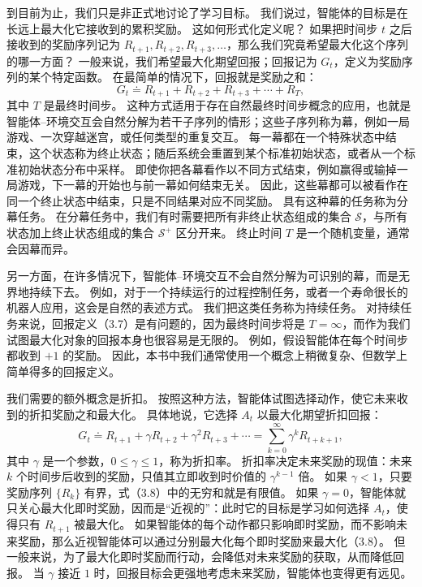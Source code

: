 \documentclass[UTF8,12pt,a4paper,fontset=fandol]{ctexart}
\begin{document}
到目前为止，我们只是非正式地讨论了学习目标。
我们说过，智能体的目标是在长远上最大化它接收到的累积奖励。
这如何形式化定义呢？
如果把时间步 $t$ 之后接收到的奖励序列记为 $R_{t+1},R_{t+2},R_{t+3},\ldots$，那么我们究竟希望最大化这个序列的哪一方面？
一般来说，我们希望最大化期望回报；回报记为 $G_t$，定义为奖励序列的某个特定函数。
在最简单的情况下，回报就是奖励之和：
\begin{equation}
G_t\doteq R_{t+1}+R_{t+2}+R_{t+3}+\cdots+R_T,
\tag{3.7}
\end{equation}
其中 $T$ 是最终时间步。
这种方式适用于存在自然最终时间步概念的应用，也就是智能体--环境交互会自然分解为若干子序列的情形；这些子序列称为幕，例如一局游戏、一次穿越迷宫，或任何类型的重复交互。
每一幕都在一个特殊状态中结束，这个状态称为终止状态；随后系统会重置到某个标准初始状态，或者从一个标准初始状态分布中采样。
即使你把各幕看作以不同方式结束，例如赢得或输掉一局游戏，下一幕的开始也与前一幕如何结束无关。
因此，这些幕都可以被看作在同一个终止状态中结束，只是不同结果对应不同奖励。
具有这种幕的任务称为分幕任务。
在分幕任务中，我们有时需要把所有非终止状态组成的集合 $\mathcal{S}$，与所有状态加上终止状态组成的集合 $\mathcal{S}^+$ 区分开来。
终止时间 $T$ 是一个随机变量，通常会因幕而异。

另一方面，在许多情况下，智能体--环境交互不会自然分解为可识别的幕，而是无界地持续下去。
例如，对于一个持续运行的过程控制任务，或者一个寿命很长的机器人应用，这会是自然的表述方式。
我们把这类任务称为持续任务。
对持续任务来说，回报定义（3.7）是有问题的，因为最终时间步将是 $T=\infty$，而作为我们试图最大化对象的回报本身也很容易是无限的。
例如，假设智能体在每个时间步都收到 $+1$ 的奖励。
因此，本书中我们通常使用一个概念上稍微复杂、但数学上简单得多的回报定义。

我们需要的额外概念是折扣。
按照这种方法，智能体试图选择动作，使它未来收到的折扣奖励之和最大化。
具体地说，它选择 $A_t$ 以最大化期望折扣回报：
\begin{equation}
G_t\doteq R_{t+1}+\gamma R_{t+2}+\gamma^2R_{t+3}+\cdots
=\sum_{k=0}^{\infty}\gamma^kR_{t+k+1},
\tag{3.8}
\end{equation}
其中 $\gamma$ 是一个参数，$0\leq\gamma\leq1$，称为折扣率。
折扣率决定未来奖励的现值：未来 $k$ 个时间步后收到的奖励，只值其立即收到时价值的 $\gamma^{k-1}$ 倍。
如果 $\gamma<1$，只要奖励序列 $\{R_k\}$ 有界，式（3.8）中的无穷和就是有限值。
如果 $\gamma=0$，智能体就只关心最大化即时奖励，因而是“近视的”：此时它的目标是学习如何选择 $A_t$，使得只有 $R_{t+1}$ 被最大化。
如果智能体的每个动作都只影响即时奖励，而不影响未来奖励，那么近视智能体可以通过分别最大化每个即时奖励来最大化（3.8）。
但一般来说，为了最大化即时奖励而行动，会降低对未来奖励的获取，从而降低回报。
当 $\gamma$ 接近 $1$ 时，回报目标会更强地考虑未来奖励，智能体也变得更有远见。
\end{document}

